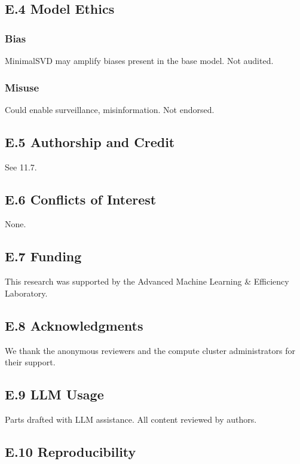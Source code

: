 \subsection{E.4 Model Ethics}

\subsubsection{Bias}

MinimalSVD may amplify biases present in the base model. Not audited.

\subsubsection{Misuse}

Could enable surveillance, misinformation. Not endorsed.

\subsection{E.5 Authorship and Credit}

See  11.7.

\subsection{E.6 Conflicts of Interest}

None.

\subsection{E.7 Funding}

This research was supported by the Advanced Machine Learning \& Efficiency Laboratory.

\subsection{E.8 Acknowledgments}

We thank the anonymous reviewers and the compute cluster administrators for their support.

\subsection{E.9 LLM Usage}

Parts drafted with LLM assistance. All content reviewed by authors.

\subsection{E.10 Reproducibility}

